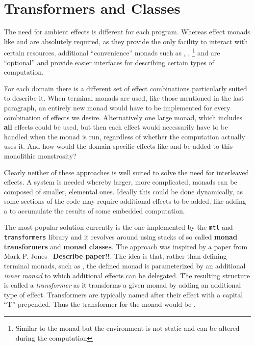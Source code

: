 \section{Transformers and Classes}

\label{sec:transformers}

The need for ambient effects is different for each program. Whereas effect
monads like \IOM{} and \HandlerForM{} are absolutely required, as they provide
the only facility to interact with certain resources, additional ``convenience''
monads such as \ReaderM{}, \WriterM{}, \StateM{}\footnote{Similar to the
  \ReaderM{} monad but the environment is not static and can be altered during
  the computation} and \ExceptM{} are ``optional'' and provide easier interfaces
for describing certain types of computation.

For each domain there is a different set of effect combinations particularly
suited to describe it. When terminal monads are used, like those mentioned in
the last paragraph, an entirely new monad would have to be implemented for every
combination of effects we desire. Alternatively one large monad, which includes
\textbf{all} effects could be used, but then each effect would necessarily have
to be handled when the monad is run, regardless of whether the computation
actually uses it. And how would the domain specific effects like \IOM{} and
\HandlerForM{} be added to this monolithic monstrosity?

Clearly neither of these approaches is well suited to solve the need for
interleaved effects. A system is needed whereby larger, more complicated, monads
can be composed of smaller, elemental ones. Ideally this could be done
dynamically, as some sections of the code may require additional effects to be
added, like adding a \WriterM{} to accumulate the results of some embedded
computation.

The most popular solution currently is the one implemented by the
\texttt{mtl}\cite{mtl} and \texttt{transformers}\cite{transformers} library and
it revolves around using stacks of so called \textbf{monad transformers} and
\textbf{monad classes}. The approach was inspired by a paper from Mark P.
Jones~\cite{transformer-inspiration} \textbf{Describe paper!!}. The idea is
that, rather than defining terminal monads, such as \ReaderM{}, the defined
monad is parameterized by an additional \emph{inner monad} to which additional
effects can be delegated. The resulting structure is called a \emph{transformer}
as it transforms a given monad by adding an additional type of effect.
Transformers are typically named after their effect with a capital ``T''
prepended. Thus the transformer for the \ReaderM{} monad would be \ReaderT{}.

